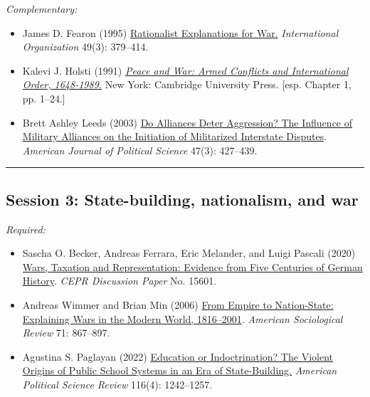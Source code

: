 \documentclass[12pt, a4paper]{article}
\begin{document}
\noindent\textit{Complementary:}

\begin{itemize}
  \item James D. Fearon (1995) \href{https://doi.org/10.1017/S0020818300033324}{Rationalist Explanations for War.} \textit{International Organization} 49(3): 379--414.
  \item Kalevi J. Holsti (1991) \href{https://www.cambridge.org/core/books/peace-and-war/37AEB58913E6EF0834D40EFE086D32FE}{\textit{Peace and War: Armed Conflicts and International Order, 1648-1989.}} New York: Cambridge University Press. [esp. Chapter 1, pp. 1--24.]
	\item Brett Ashley Leeds (2003) \href{https://doi.org/10.1111/1540-5907.00031}{Do Alliances Deter Aggression? The Influence of Military Alliances on the Initiation of Militarized Interstate Disputes}. \textit{American Journal of Political Science} 47(3): 427--439.
\end{itemize}

\vspace{20pt}
\hrule
\subsection*{Session 3: State-building, nationalism, and war}

\noindent\textit{Required:}

\begin{itemize}
	\item Sascha O. Becker, Andreas Ferrara, Eric Melander, and Luigi Pascali (2020) \href{https://cepr.org/publications/dp15601}{Wars, Taxation and Representation: Evidence from Five Centuries of German History}. \textit{CEPR Discussion Paper} No. 15601.
	\item Andreas Wimmer and Brian Min (2006) \href{https://doi.org/10.1177/000312240607100601}{From Empire to Nation-State: Explaining Wars in the Modern World, 1816–2001}. \textit{American Sociological Review} 71: 867--897.
  \item Agustina S. Paglayan (2022) \href{https://doi.org/10.1017/S0003055422000247}{Education or Indoctrination? The Violent Origins of Public School Systems in an Era of State-Building.} \textit{American Political Science Review} 116(4): 1242--1257.
\end{itemize}
\end{document}
